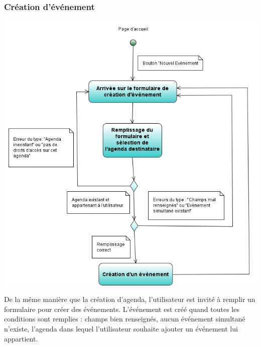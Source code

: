 \documentclass[12pt , a4paper]{article}
\begin{document}
\subsubsection{Création d'événement}
\begin{center}
  \includegraphics[scale=0.6]{./images/diag_act_creation_evenement.png}
\end{center}
\noindent De la m\^eme manière que la création d'agenda, l'utilisateur est invité à remplir un formulaire pour créer des événements. L'événement est créé quand toutes les conditions sont remplies :
champs bien renseignés, aucun événement simultané n'existe, l'agenda dans lequel l'utilisateur souhaite ajouter un événement lui appartient.
\end{document}
